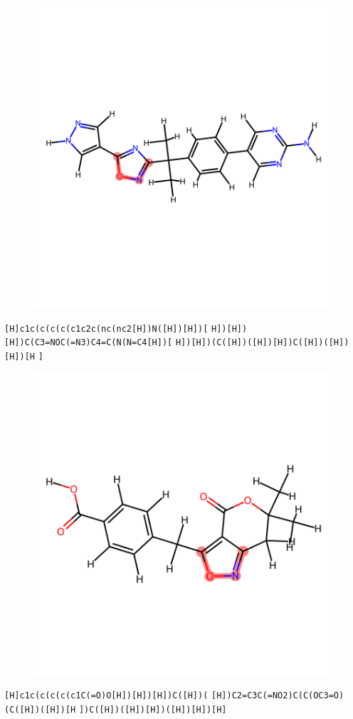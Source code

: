 \documentclass{article}
\begin{document}
\begin{figure}[ht]
\centering
    \includegraphics{mol186.png}
\end{figure}
\verb|[H]c1c(c(c(c(c1c2c(nc(nc2[H])N([H])[H])[| \verb|H])[H])[H])C(C3=NOC(=N3)C4=C(N(N=C4[H])[| \verb|H])[H])(C([H])([H])[H])C([H])([H])[H])[H| \verb|]|

\begin{figure}[ht]
\centering
    \includegraphics{mol187.png}
\end{figure}
\verb|[H]c1c(c(c(c(c1C(=O)O[H])[H])[H])C([H])(| \verb|[H])C2=C3C(=NO2)C(C(OC3=O)(C([H])([H])[H| \verb|])C([H])([H])[H])([H])[H])[H]|
\end{document}
